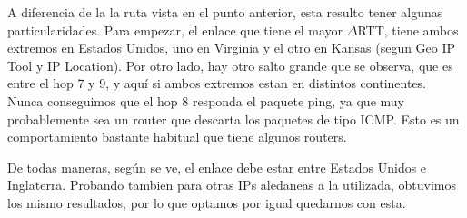 A diferencia de la la ruta vista en el punto anterior, esta resulto tener algunas particularidades. Para empezar, el enlace que tiene el mayor $\Delta$RTT, tiene ambos extremos en Estados Unidos, uno en Virginia y el otro en Kansas (segun Geo IP Tool y IP Location). Por otro lado, hay otro salto grande que se observa, que es entre el hop 7 y 9, y aquí si ambos extremos estan en distintos continentes. Nunca conseguimos que el hop 8 responda el paquete ping, ya que muy probablemente sea un router que descarta los paquetes de tipo ICMP. Esto es un comportamiento bastante habitual que tiene algunos routers.

De todas maneras, según se ve, el enlace debe estar entre Estados Unidos e Inglaterra. Probando tambien para otras IPs aledaneas a la utilizada, obtuvimos los mismo resultados, por lo que optamos por igual quedarnos con esta.

